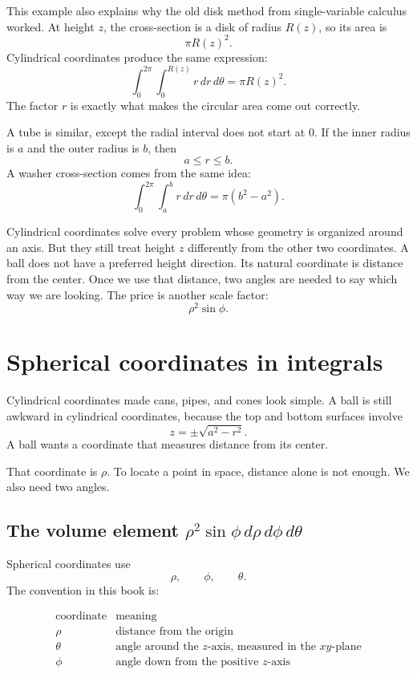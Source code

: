 This example also explains why the old disk method from single-variable calculus
worked.  At height \(z\), the cross-section is a disk of radius \(R(z)\), so its area is
\[
    \pi R(z)^2.
\]
Cylindrical coordinates produce the same expression:
\[
    \int_0^{2\pi}\int_0^{R(z)} r\,dr\,d\theta
    =
    \pi R(z)^2.
\]
The factor \(r\) is exactly what makes the circular area come out correctly.

A tube is similar, except the radial interval does not start at \(0\).  If the inner radius is
\(a\) and the outer radius is \(b\), then
\[
    a\le r\le b.
\]
A washer cross-section comes from the same idea:
\[
    \int_0^{2\pi}\int_a^b r\,dr\,d\theta
    =
    \pi(b^2-a^2).
\]

Cylindrical coordinates solve every problem whose geometry is organized around an
axis.  But they still treat height \(z\) differently from the other two coordinates.  A ball
does not have a preferred height direction.  Its natural coordinate is distance from the
center.  Once we use that distance, two angles are needed to say which way we are
looking.  The price is another scale factor:
\[
    \rho^2\sin\phi.
\]

\section{Spherical coordinates in integrals}
\label{sec:11.4}

Cylindrical coordinates made cans, pipes, and cones look simple.  A ball is still awkward
in cylindrical coordinates, because the top and bottom surfaces involve
\[
    z=\pm\sqrt{a^2-r^2}.
\]
A ball wants a coordinate that measures distance from its center.

That coordinate is \(\rho\).  To locate a point in space, distance alone is not enough.
We also need two angles.

\subsection{The volume element
\texorpdfstring{\(\rho^2\sin\phi\,d\rho\,d\phi\,d\theta\)}
{rho squared sin phi d rho d phi d theta}}

Spherical coordinates use
\[
    \rho,\qquad \phi,\qquad \theta.
\]
The convention in this book is:

\[
\begin{array}{c|c}
\text{coordinate} & \text{meaning} \\ \hline
\rho & \text{distance from the origin}\\[1mm]
\theta & \text{angle around the \(z\)-axis, measured in the \(xy\)-plane}\\[1mm]
\phi & \text{angle down from the positive \(z\)-axis}
\end{array}
\]

